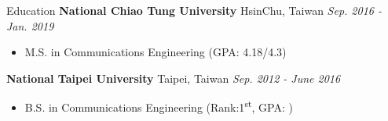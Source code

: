 \documentclass{resume} %
\newcommand{\ts}{\textsuperscript}
\begin{document}

\begin{rSection}{Education}
{\bf National Chiao Tung University} \hfill {HsinChu, Taiwan} \hfill {\em Sep. 2016 - Jan. 2019}
\begin{itemize} \item {M.S. in Communications Engineering (GPA: 4.18/4.3)} \end{itemize}
{\bf National Taipei University} \hfill {Taipei, Taiwan} \hfill {\em Sep. 2012 - June 2016}
\begin{itemize} \item {B.S. in Communications Engineering (Rank:1\ts{st}, GPA: )} \end{itemize}
\end{rSection}

\end{document}
